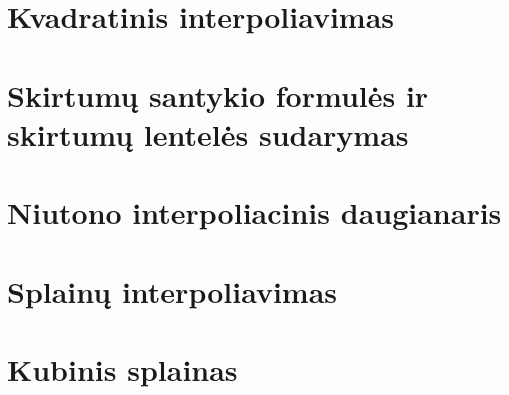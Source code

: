 \section{Kvadratinis interpoliavimas}
\cite[165-167]{textbook}
\section{Skirtumų santykio formulės ir skirtumų lentelės sudarymas}
\cite[163]{textbook}
\section{Niutono interpoliacinis daugianaris}
\cite[168-169]{textbook}

\section{Splainų interpoliavimas}
\cite[170-173]{textbook}
\section{Kubinis splainas}
\cite[174-175]{textbook}

